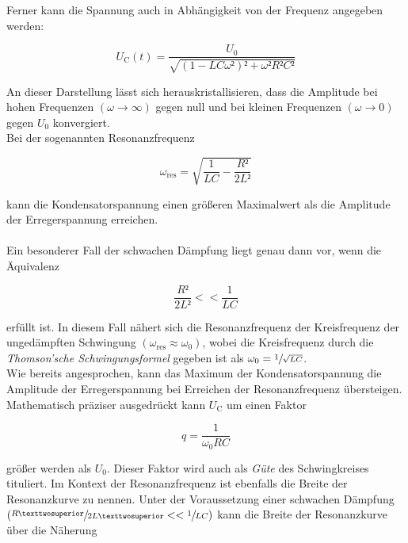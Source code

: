 \noindent Ferner kann die Spannung auch in Abhängigkeit von der Frequenz angegeben werden:

\begin{equation*}
    U_\text{C}(t) = \frac{U_0}{\sqrt{\left(1 - LC\omega²\right)² + \omega²R²C²}}
\end{equation*}

\noindent An dieser Darstellung lässt sich herauskristallisieren, dass die Amplitude bei hohen Frequenzen 
$\left(\omega \rightarrow \infty\right)$ gegen null und bei kleinen Frequenzen $\left(\omega \rightarrow 0\right)$ 
gegen $U_0$ konvergiert. \\
Bei der sogenannten Resonanzfrequenz 

\begin{equation*}
    \omega_\text{res} = \sqrt{\frac{1}{LC} - \frac{R²}{2L²}}
\end{equation*}

\noindent kann die Kondensatorspannung einen größeren Maximalwert als die Amplitude der Erregerspannung erreichen.\\\\
Ein besonderer Fall der schwachen Dämpfung liegt genau dann vor, wenn die Äquivalenz  

\begin{equation*}
    \frac{R²}{2L²} << \frac{1}{LC}
\end{equation*}

\noindent erfüllt ist. In diesem Fall nähert sich die Resonanzfrequenz der Kreisfrequenz der ungedämpften Schwingung
$(\omega_\text{res} \approx \omega_0)$, wobei die Kreisfrequenz durch die \emph{Thomson'sche Schwingungsformel}\cite{Thomson}
gegeben ist als $\omega_0 = \sfrac{1}{\sqrt{LC}}$.\\
Wie bereits angesprochen, kann das Maximum der Kondensatorspannung die Amplitude der Erregerspannung bei Erreichen der 
Resonanzfrequenz übersteigen. Mathematisch präziser ausgedrückt kann $U_\text{C}$ um einen Faktor

\begin{equation*}
    q = \frac{1}{\omega_{0}RC}
\end{equation*}

\noindent größer werden als $U_0$. Dieser Faktor wird auch als \emph{Güte} des Schwingkreises tituliert. Im Kontext der Resonanzfrequenz ist 
ebenfalls die Breite der Resonanzkurve zu nennen. Unter der Voraussetzung einer schwachen Dämpfung $\left(\sfrac{R²}{2L²} << \sfrac{1}{LC}\right)$
kann die Breite der Resonanzkurve über die Näherung

